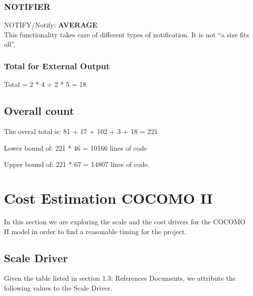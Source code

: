 \documentclass[11pt]{article} %
\newcommand{\extInput}[3]{ #1:  \textbf{#2} \\ #3  }
\begin{document}
\subsubsection{NOTIFIER}
\begin{description}
	\item \extInput
		{NOTIFY/Notify}
		{AVERAGE}
		{This functionality takes care of different types of notification. It is not ``a size fits all''.}
\end{description}

\subsubsection{Total for External Output}
Total = 2 * 4 + 2 * 5 = 18

\subsection{Overall count}

The overal total is: \hfill
81 + 17 + 102 + 3 + 18 = 221


Lower bound of:\hfill
221 * 46 = {\Large 10166} lines of code

Upper bound of: \hfill
221 * 67 = {\Large 14807} lines of code.




\newpage
\section{Cost Estimation COCOMO II}

In this section we are exploring the scale and the cost drivers for the COCOMO II model in order to find a reasonable timing for the project.

\subsection{Scale Driver}

Given the table listed in section 1.3: References Documents, we attribute the following values to the Scale Driver.
\end{document}
